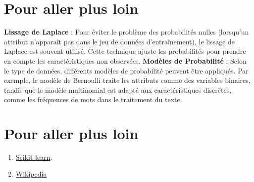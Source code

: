\documentclass[a0,portrait]{a0poster}
\begin{document}

\color{DarkSlateGray} %
\section{Pour aller plus loin}
\textbf{Lissage de Laplace} : Pour éviter le problème des probabilités nulles (lorsqu'un attribut n'apparaît pas dans le jeu de données d'entraînement), le lissage de Laplace est souvent utilisé. Cette technique ajuste les probabilités pour prendre en compte les caractéristiques non observées.\newline
\textbf{Modèles de Probabilité} : Selon le type de données, différents modèles de probabilité peuvent être appliqués. Par exemple, le modèle de Bernoulli traite les attributs comme des variables binaires, tandis que le modèle multinomial est adapté aux caractéristiques discrètes, comme les fréquences de mots dans le traitement du texte.



\section*{Pour aller plus loin}

\begin{enumerate}
    \item \href{https://scikit-learn.org/stable/auto_examples/linear_model/plot_ols.html}{Scikit-learn}.
    \item \href{https://en.wikipedia.org/wiki/Linear_regression.}{Wikipedia}
\end{enumerate}


\end{document}
